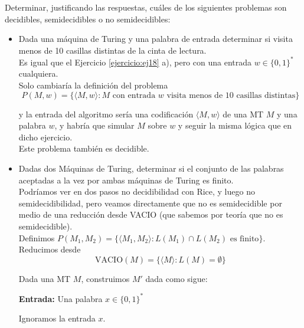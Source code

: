 \begin{ejercicio}
    Determinar, justificando las respuestas, cuáles de los siguientes problemas son decidibles, semidecidibles o no semidecidibles:
    \begin{itemize}
        \item[a)] Dada una máquina de Turing y una palabra de entrada determinar si visita menos de 10 casillas 
        distintas de la cinta de lectura. \\ %

        Es igual que el Ejercicio \ref{ejercicio:ej18} a), pero con una entrada $w \in \{0,1\}^{*}$ cualquiera. \\

        Solo cambiaría la definición del problema $$P(M,w) = \{\langle M, w \rangle : M \text{ con entrada $w$ visita menos de 10 casillas distintas}\}$$

        y la entrada del algoritmo sería una codificación $\langle M,w \rangle$ de una MT $M$ y una palabra $w$, y habría
        que simular $M$ sobre $w$ y seguir la misma lógica que en dicho ejercicio. \\

        Este problema también es decidible.

        \item[b)] Dadas dos Máquinas de Turing, determinar si el conjunto de las palabras aceptadas a la vez por 
        ambas máquinas de Turing es finito. \\ %

        Podríamos ver en dos pasos no decidibilidad con Rice, y luego no semidecidibilidad, pero veamos directamente
        que no es semidecidible por medio de una reducción desde VACIO (que sabemos por teoría que no es semidecidible). \\

        Definimos $P(M_1, M_2) = \{\langle M_1, M_2 \rangle : L(M_1) \cap L(M_2) \text{ es finito}\}$. Reducimos desde
        $$\text{VACIO}(M) = \{\langle M \rangle : L(M) = \emptyset\}$$

        Dada una MT $M$, construimos $M'$ dada como sigue:
        
        \begin{algorithm}
            \caption{MT $M'$}
            \label{algorithm:N-prima}
            \begin{algorithmic}
                \State \textbf{Entrada:} Una palabra $x \in \{0,1\}^{*}$

                \State Ignoramos la entrada $x$.


\end{algorithmic}
\end{algorithm}
\end{itemize}
\end{ejercicio}
